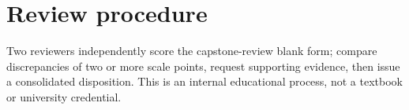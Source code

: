 \documentclass[11pt]{article}
\begin{document}
\section{Review procedure}
Two reviewers independently score the capstone-review blank form; compare discrepancies of two or more scale points, request supporting evidence, then issue a consolidated disposition. This is an internal educational process, not a textbook or university credential.
\end{document}
